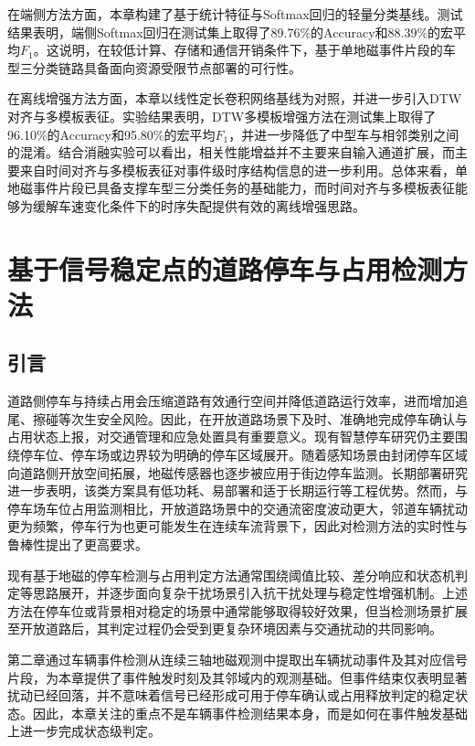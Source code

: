 \documentclass{xdupgthesis}
\begin{document}
在端侧方法方面，本章构建了基于统计特征与Softmax回归的轻量分类基线。测试结果表明，端侧Softmax回归在测试集上取得了89.76\%的Accuracy和88.39\%的宏平均$F_1$。这说明，在较低计算、存储和通信开销条件下，基于单地磁事件片段的车型三分类链路具备面向资源受限节点部署的可行性。

在离线增强方法方面，本章以线性定长卷积网络基线为对照，并进一步引入DTW对齐与多模板表征。实验结果表明，DTW多模板增强方法在测试集上取得了96.10\%的Accuracy和95.80\%的宏平均$F_1$，并进一步降低了中型车与相邻类别之间的混淆。结合消融实验可以看出，相关性能增益并不主要来自输入通道扩展，而主要来自时间对齐与多模板表征对事件级时序结构信息的进一步利用。总体来看，单地磁事件片段已具备支撑车型三分类任务的基础能力，而时间对齐与多模板表征能够为缓解车速变化条件下的时序失配提供有效的离线增强思路。




\chapter{基于信号稳定点的道路停车与占用检测方法}
\label{ch:ch4_parking}

\section{引言}
\label{sec:ch4_intro}

道路侧停车与持续占用会压缩道路有效通行空间并降低道路运行效率，进而增加追尾、擦碰等次生安全风险。因此，在开放道路场景下及时、准确地完成停车确认与占用状态上报，对交通管理和应急处置具有重要意义。现有智慧停车研究仍主要围绕停车位、停车场或边界较为明确的停车区域展开\cite{diazogas2020spsurvey}。随着感知场景由封闭停车区域向道路侧开放空间拓展，地磁传感器也逐步被应用于街边停车监测\cite{ch4_gu2013streetparking}。长期部署研究进一步表明，该类方案具有低功耗、易部署和适于长期运行等工程优势\cite{ch4_huang2017easydeploy}。然而，与停车场车位占用监测相比，开放道路场景中的交通流密度波动更大，邻道车辆扰动更为频繁，停车行为也更可能发生在连续车流背景下，因此对检测方法的实时性与鲁棒性提出了更高要求。

现有基于地磁的停车检测与占用判定方法通常围绕阈值比较、差分响应和状态机判定等思路展开，并逐步面向复杂干扰场景引入抗干扰处理与稳定性增强机制\cite{ch4_wang2025parkingdetectreview}。上述方法在停车位或背景相对稳定的场景中通常能够取得较好效果，但当检测场景扩展至开放道路后，其判定过程仍会受到更复杂环境因素与交通扰动的共同影响。

第二章通过车辆事件检测从连续三轴地磁观测中提取出车辆扰动事件及其对应信号片段，为本章提供了事件触发时刻及其邻域内的观测基础。但事件结束仅表明显著扰动已经回落，并不意味着信号已经形成可用于停车确认或占用释放判定的稳定状态。因此，本章关注的重点不是车辆事件检测结果本身，而是如何在事件触发基础上进一步完成状态级判定。
\end{document}

